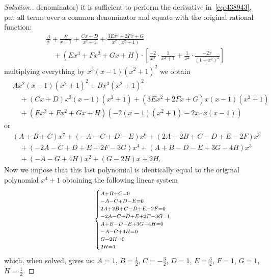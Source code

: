\begin{proof}[Solution.]
denominator)
it is sufficient to perform the derivative in~\eqref{eq:438943}, 
put all terms over a common denominator 
and equate with the original rational function:
\begin{align*}
  &\frac{A}{x} + \frac{B}{x-1} + \frac{Cx+D}{x^2+1}
  + \frac{3 E x^2 + 2 F x + G}{x^2(x^2+1)} \\
    & \quad + (E x^3 + F x^2 + G x + H)\cdot \left[\frac{-2}{x^3}\cdot
  \frac{1}{x^2+1}
  + \frac{1}{x^2}\cdot\frac{-2x}{(1+x^2)^2}\right]
\end{align*}
multiplying everything by $x^3(x-1)(x^2+1)^2$ we obtain
\begin{align*}
  &Ax^2(x-1)(x^2+1)^2 + Bx^3(x^2+1)^2 \\
  &\quad + (Cx+D)x^3(x-1)(x^2+1) + (3Ex^2+2Fx+G)x(x-1)(x^2+1)\\
  &\quad + (Ex^3+Fx^2+Gx+H)(-2(x-1)(x^2+1)-2x\cdot x(x-1))
\end{align*}
or
\begin{align*}
  &(A+B+C)x^7+(-A-C+D-E)x^6 + (2A+2B+C-D+E-2F)x^5 \\
  &\quad  +(-2A-C+D+E+2F-3G)x^4 + (A+B-D-E+3G-4H)x^3 \\
  &\quad  + (-A-G+4H)x^2 + (G-2H) x + 2H.
\end{align*}
Now we impose that this last polynomial is identically equal
to the original polynomial $x^4+1$ obtaining the following linear system
\[
  \begin{dcases}
    \scriptstyle
    A+B+C=0 \\[-1ex]
    \scriptstyle
    -A-C+D-E=0 \\[-1ex]
    \scriptstyle
    2A + 2B + C - D + E - 2 F = 0\\[-1ex]
    \scriptstyle
    -2A-C+D+E+2F-3G = 1\\[-1ex]
    \scriptstyle
    A+B-D-E+3G-4H=0\\[-1ex]
    \scriptstyle
    -A-G+4H=0\\[-1ex]
    \scriptstyle
    G-2H=0\\[-1ex]
    \scriptstyle
    2H=1
  \end{dcases}
\]
which, when solved, gives us: $A=1$, $B=\frac 1 2$, $C = -\frac 3 2$, $D=1$,
$E=\frac 3 2$, $F=1$, $G=1$, $H=\frac 1 2$.

\end{proof}
